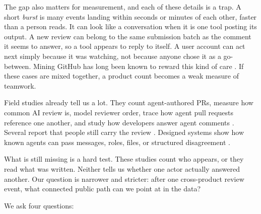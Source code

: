 \documentclass[lineno,pdflatex,sn-basic]{sn-jnl}
\begin{document}
The gap also matters for measurement, and each of these details is a trap. A short \emph{burst} is many events landing within seconds or minutes of each
other, faster than a person reads. It can look like a conversation when it is
one tool posting its output. A new review can belong to the same submission batch as the
comment it seems to answer, so a tool appears to reply to itself. A user account
can act next simply because it was watching, not because anyone chose it as a
go-between. Mining GitHub has long been known to reward this kind of care
\citep{kalliamvakou2016perils}. If these cases are mixed together, a product count
becomes a weak measure of teamwork.

Field studies already tell us a lot. They count agent-authored PRs, measure how common AI review is, model reviewer
order, trace how agent pull requests reference one another, and study how
developers answer agent comments \citep{li2026aidev,selvanayagam2026a2a,zhong2026agenticreview,
cynthia2026responses,khemissi2026references,duma2026reviews}. Several report that
people still carry the review \citep{zhong2026synergy,chowdhury2026industry}.
Designed systems show how known agents can pass messages, roles, files, or
structured disagreement
\citep{destefanis2026coordinate,qiu2026adversarial,zhang2026reporeviewer}.

What is still missing is a hard test. These studies count who appears, or they
read what was written. Neither tells us whether one actor actually answered
another. Our question is narrower and stricter: after one cross-product review
event, what connected public path can we point at in the data?

We ask four questions:
\end{document}
